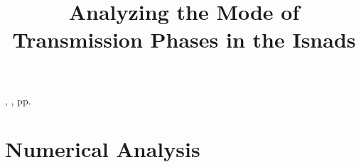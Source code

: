 \documentclass[12pt]{article}
\title{Analyzing the Mode of Transmission Phases in the Isnads}
\date{} %
\begin{document}

\begin{htmlonly}
\href{\jref}{\jhead}, \jdate, pp.\
\end{htmlonly}

\maketitle
\thispagestyle{firstpage}



\newpage

\section{Numerical Analysis}
\end{document}
